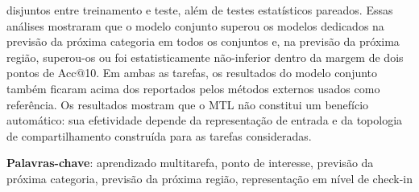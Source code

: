 \begin{resumo}[Resumo]
        disjuntos entre treinamento e teste, além de testes estatísticos pareados.
        Essas análises mostraram que o modelo conjunto superou os modelos dedicados na
        previsão da próxima categoria em todos os conjuntos e, na previsão da próxima
        região, superou-os ou foi estatisticamente não-inferior dentro da margem de dois
        pontos de Acc@10. Em ambas as tarefas, os resultados do modelo conjunto também
        ficaram acima dos reportados pelos métodos externos usados como referência.
        Os resultados mostram que o MTL não constitui um benefício automático: sua efetividade depende da representação de entrada e da topologia de compartilhamento construída para as tarefas consideradas.

        \vspace{\onelineskip}
        \noindent
        \begin{minipage}{\linewidth}
            \textbf{Palavras-chave}:
            aprendizado multitarefa, ponto de interesse, previsão da próxima categoria,
            previsão da próxima região, representação em nível de check-in
        \end{minipage}
    \end{resumo}

